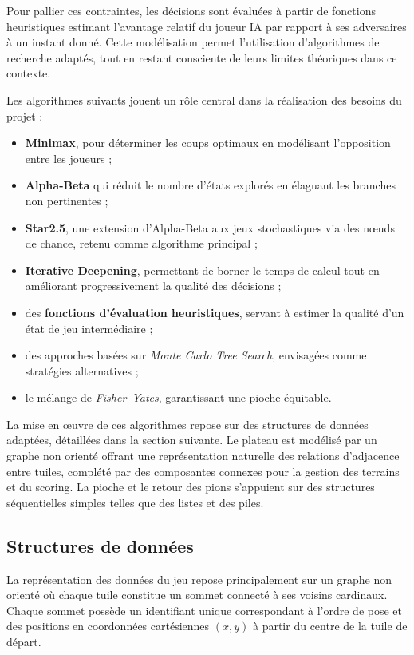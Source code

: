 \documentclass[11pt]{article}
\begin{document}
Pour pallier ces contraintes, les décisions sont évaluées à partir de 
fonctions heuristiques estimant l'avantage relatif du joueur IA par 
rapport à ses adversaires à un instant donné. Cette modélisation permet 
l'utilisation d'algorithmes de recherche adaptés, tout en restant 
consciente de leurs limites théoriques dans ce contexte.

Les algorithmes suivants jouent un rôle central dans la réalisation 
des besoins du projet :
\begin{itemize}
  \item[-] \textbf{Minimax}\cite{minimax}, pour déterminer les coups 
  optimaux en modélisant l'opposition entre les joueurs ;
  \item[-] \textbf{Alpha-Beta}\cite{alpha_beta} qui réduit le nombre 
  d'états explorés en élaguant les branches non pertinentes ;
  \item[-] \textbf{Star2.5}, une extension d'Alpha-Beta aux jeux 
  stochastiques via des nœuds de chance, retenu comme algorithme 
  principal ;
  \item[-] \textbf{Iterative Deepening}\cite{iterative_deepening}, 
  permettant de borner le temps de calcul tout en améliorant 
  progressivement la qualité des décisions ;
  \item[-] des \textbf{fonctions d'évaluation heuristiques}, servant 
  à estimer la qualité d'un état de jeu intermédiaire ;
  \item[-] des approches basées sur \textit{Monte Carlo Tree 
  Search}\cite{monte_carlo}, envisagées comme stratégies alternatives ;
  \item[-] le mélange de \textit{Fisher–Yates}\cite{fisher_yates}, 
  garantissant une pioche équitable.
\end{itemize}

La mise en œuvre de ces algorithmes repose sur des structures de 
données adaptées, détaillées dans la section suivante. Le plateau est 
modélisé par un graphe non orienté offrant une représentation naturelle 
des relations d'adjacence entre tuiles, complété par des composantes 
connexes pour la gestion des terrains et du scoring. La pioche et le 
retour des pions s'appuient sur des structures séquentielles simples 
telles que des listes et des piles.
\subsection{Structures de données}


La représentation des données du jeu repose principalement sur un 
graphe non orienté où chaque tuile constitue un sommet connecté à 
ses voisins cardinaux. Chaque sommet possède un identifiant unique correspondant à l'ordre de pose et des positions en coordonnées cartésiennes $(x, y)$ à partir du 
centre de la tuile de départ.
\end{document}
